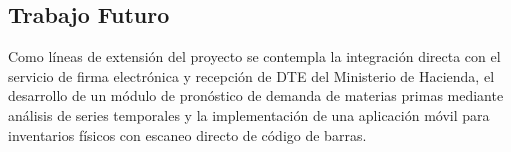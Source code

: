 \subsection{Trabajo Futuro}
Como líneas de extensión del proyecto se contempla la integración directa con el servicio de firma electrónica y recepción de DTE del Ministerio de Hacienda, el desarrollo de un módulo de pronóstico de demanda de materias primas mediante análisis de series temporales y la implementación de una aplicación móvil para inventarios físicos con escaneo directo de código de barras.



